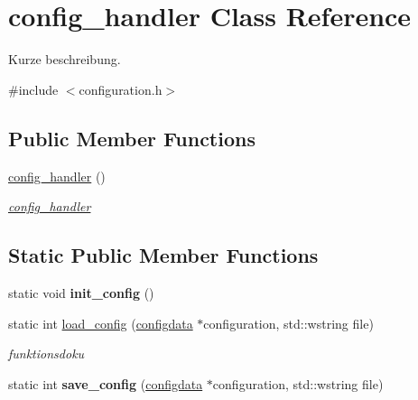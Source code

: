 \hypertarget{classconfig__handler}{}\section{config\+\_\+handler Class Reference}
\label{classconfig__handler}


Kurze beschreibung.  




{\ttfamily \#include $<$configuration.\+h$>$}

\subsection*{Public Member Functions}
\begin{DoxyCompactItemize}
\item 
\hyperlink{classconfig__handler_af8c45bcc4acdc59836d875c2b8062dea}{config\+\_\+handler} ()
\begin{DoxyCompactList}\small\item\em \hyperlink{classconfig__handler}{config\+\_\+handler} \end{DoxyCompactList}\end{DoxyCompactItemize}
\subsection*{Static Public Member Functions}
\begin{DoxyCompactItemize}
\item 
\hypertarget{classconfig__handler_aa312a14589652813cccceaacde810cf1}{}static void {\bfseries init\+\_\+config} ()\label{classconfig__handler_aa312a14589652813cccceaacde810cf1}

\item 
static int \hyperlink{classconfig__handler_a3ad271a6752c73f9dabecb20e619e8f2}{load\+\_\+config} (\hyperlink{structconfigdata}{configdata} $\ast$configuration, std\+::wstring file)
\begin{DoxyCompactList}\small\item\em funktionsdoku \end{DoxyCompactList}\item 
\hypertarget{classconfig__handler_ab08babb69865e394f757b7f9f03cf9ad}{}static int {\bfseries save\+\_\+config} (\hyperlink{structconfigdata}{configdata} $\ast$configuration, std\+::wstring file)\label{classconfig__handler_ab08babb69865e394f757b7f9f03cf9ad}

\end{DoxyCompactItemize}
